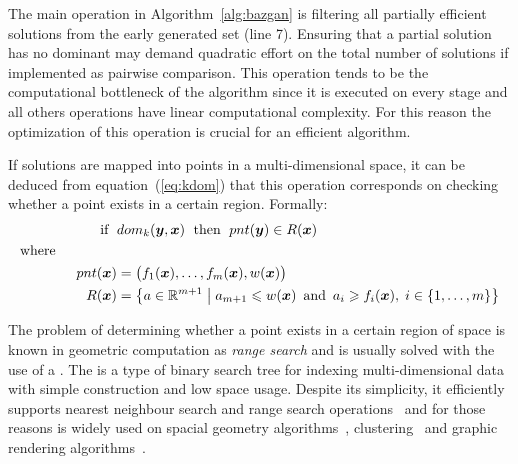 

The main operation in Algorithm~\ref{alg:bazgan} is
filtering all partially efficient solutions
from the early generated set (line 7).
Ensuring that a partial solution has no dominant
may demand quadratic effort on the total number of solutions
if implemented as pairwise comparison.
This operation tends to be the computational bottleneck of the algorithm
since it is executed on every stage
and all others operations have linear computational complexity.
For this reason the optimization of this operation
is crucial for an efficient algorithm.

If solutions are mapped into points in a multi-dimensional space,
it can be deduced from equation~(\ref{eq:kdom}) that
this operation corresponds on checking whether a point exists in a certain region.
Formally:
\begin{align*}
    \text{ if } \; &dom_k(\boldsymbol{y}, \boldsymbol{x}) \; \text{ then } \; pnt(\boldsymbol{y}) \in R(\boldsymbol{x}) \\
  \text{where} \phantom{mmmmm} \\
    pnt(\boldsymbol{x}) &= \big(f_{1}(\boldsymbol{x}), \ldots, f_{m}(\boldsymbol{x}), w(\boldsymbol{x})\big) \\
    R(\boldsymbol{x}) &= \left\{ a \in \mathbb{R}^{m+1} \;\middle|\;
      a_{m+1} \leqslant w(\boldsymbol{x})
      \, \text{ and } \,
      a_i \geqslant f_{i}(\boldsymbol{x}), \; i \in \{1, \ldots, m\}
      \right\}
\end{align*}

The problem of determining whether a point exists in a certain region
of space is known in geometric computation as
\emph{range search}\cite{agarwal1999geometric}
and is usually solved with the use of a
\kdtree{}\cite{preparata2012computational}.
The \kdtree{} is a type of binary search tree for indexing multi-dimensional
data with simple construction and low space usage.
Despite its simplicity, it efficiently supports nearest
neighbour search and range search operations~\cite{bentley1975} and
for those reasons \kdtree{} is widely used on
spacial geometry algorithms~\cite{preparata2012computational, guttman1984r},
clustering~\cite{kanungo2002efficient, indyk1998approximate}
and graphic rendering algorithms~\cite{owens2007survey}.

